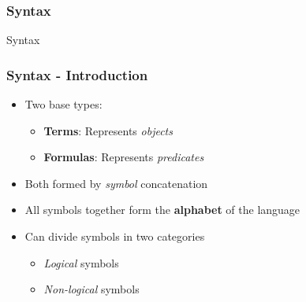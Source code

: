 \documentclass{beamer}
\begin{document}
            \subsubsection{Syntax}
                \begin{frame}
                    \begin{center}
                        \begin{Huge}
                            \textcolor{title_blue}{Syntax}
                        \end{Huge}
                    \end{center}
                \end{frame}

                \begin{frame}
                    \frametitle{Syntax - Introduction}
                    \begin{itemize}
                        \item Two base types:
                            \begin{itemize}
                                \item \textbf{Terms}: Represents \textit{objects}
                                \item \textbf{Formulas}: Represents \textit{predicates}
                            \end{itemize}
                        \item Both formed by \textit{symbol} concatenation
                        \item All symbols together form the \textbf{alphabet} of the language
                        \item Can divide symbols in two categories
                            \begin{itemize}
                                \item \textit{Logical} symbols
                                \item \textit{Non-logical} symbols
                            \end{itemize}
                    \end{itemize}
                \end{frame}
\end{document}
